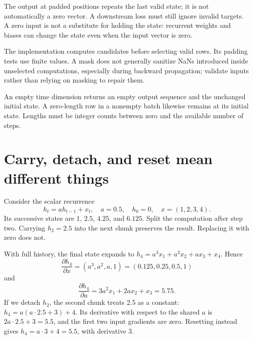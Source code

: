 
The output at padded positions repeats the last valid state; it is not
automatically a zero vector. A downstream loss must still ignore invalid
targets. A zero input is not a substitute for holding the state: recurrent
weights and biases can change the state even when the input vector is zero.

The implementation computes candidates before selecting valid rows.
Its padding tests use finite values. A mask does not generally sanitize NaNs
introduced inside unselected computations, especially during backward
propagation; validate inputs rather than relying on masking to repair them.

An empty time dimension returns an empty output sequence and the unchanged
initial state. A zero-length row in a nonempty batch likewise remains at its
initial state. Lengths must be integer counts between zero and the available
number of steps.

\section{Carry, detach, and reset mean different things}

Consider the scalar recurrence
\begin{equation}
h_t=ah_{t-1}+x_t,\quad
a=0.5,\quad h_0=0,\quad x=(1,2,3,4).
\label{eq:scalar}
\end{equation}
Its successive states are $1$, $2.5$, $4.25$, and $6.125$.
Split the computation after step two. Carrying $h_2=2.5$ into the next
chunk preserves the result. Replacing it with zero does not.



With full history, the final state expands to
$h_4=a^3x_1+a^2x_2+ax_3+x_4$. Hence
\begin{equation}
\frac{\partial h_4}{\partial x}=(a^3,a^2,a,1)
=(0.125,0.25,0.5,1)
\end{equation}
and
\begin{equation}
\frac{\partial h_4}{\partial a}
=3a^2x_1+2ax_2+x_3=5.75.
\end{equation}
If we detach $h_2$, the second chunk treats 2.5 as a constant:
$h_4=a(a\cdot2.5+3)+4$. Its derivative with respect to the shared $a$
is $2a\cdot2.5+3=5.5$, and the first two input gradients are zero.
Resetting instead gives $h_4=a\cdot3+4=5.5$, with derivative 3.

